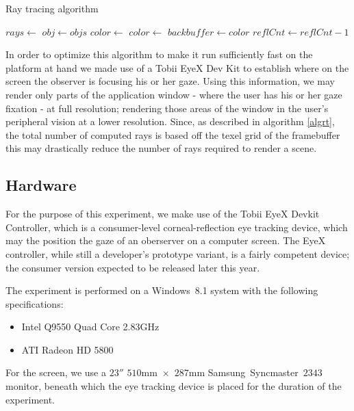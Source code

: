 \begin{algorithm}
\begin{algorithmic}[1]
\caption{Ray tracing algorithm}\label{algrt}
\State $rays\gets$
    \State $obj\gets objs$
\EndIf
\State $color\gets$
\State $color\gets$
\EndFor
\State $backbuffer\gets color$
\EndFor
\State $reflCnt\gets reflCnt - 1$
\EndWhile
\EndProcedure
\end{algorithmic}
\end{algorithm}

In order to optimize this algorithm to make it run sufficiently fast on the platform at hand we made use of a Tobii EyeX Dev Kit to establish where on the screen the observer is focusing his or her gaze.
Using this information, we may render only parts of the application window - where the user has his or her gaze fixation - at full resolution; rendering those areas of the window in the user's peripheral vision at a lower resolution.
Since, as described in algorithm \ref{algrt}, the total number of computed rays is based off the texel grid of the framebuffer this may drastically reduce the number of rays required to render a scene.

\subsection{Hardware}
For the purpose of this experiment, we make use of the Tobii EyeX Devkit Controller, which is a consumer-level corneal-reflection eye tracking device, which may the position the gaze of an oberserver on a computer screen.
The EyeX controller, while still a developer's prototype variant, is a fairly competent device; the consumer version expected to be released later this year.

The experiment is performed on a Windows~8.1 system with the following specifications:
\begin{itemize}
\setlength\itemsep{0em}
\item Intel Q9550 Quad Core 2.83GHz
\item ATI Radeon HD 5800
\end{itemize}

For the screen, we use a $23''$ $510$mm~$\times$~$287$mm Samsung~Syncmaster~$2343$ monitor, beneath which the eye tracking device is placed for the duration of the experiment.

